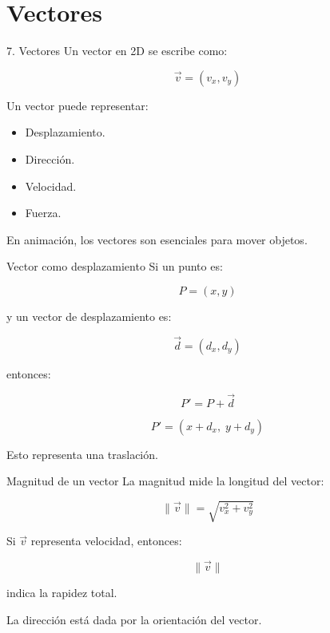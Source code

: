 \documentclass{beamer}
\begin{document}
\section{Vectores}

\begin{frame}{7. Vectores}
Un vector en 2D se escribe como:

\[
\vec{v}=(v_x,v_y)
\]

\medskip

Un vector puede representar:

\begin{itemize}
    \item Desplazamiento.
    \item Dirección.
    \item Velocidad.
    \item Fuerza.
\end{itemize}

\medskip

En animación, los vectores son esenciales para mover objetos.
\end{frame}

\begin{frame}{Vector como desplazamiento}
Si un punto es:

\[
P=(x,y)
\]

y un vector de desplazamiento es:

\[
\vec{d}=(d_x,d_y)
\]

entonces:

\[
P'=P+\vec{d}
\]

\[
P'=(x+d_x,\;y+d_y)
\]

\medskip

Esto representa una traslación.
\end{frame}

\begin{frame}{Magnitud de un vector}
La magnitud mide la longitud del vector:

\[
\|\vec{v}\|=\sqrt{v_x^2+v_y^2}
\]

\medskip

Si \(\vec{v}\) representa velocidad, entonces:

\[
\|\vec{v}\|
\]

indica la rapidez total.

\medskip

La dirección está dada por la orientación del vector.
\end{frame}
\end{document}
